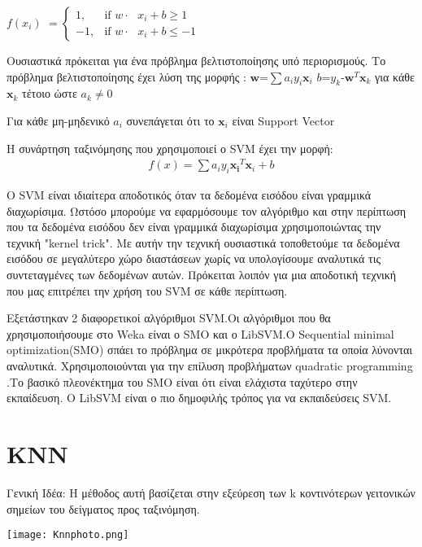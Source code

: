  $f(x_i)$ 
$ = \begin{cases} 1, & \mbox{if } w\cdot\mbox{ $x_i +b \geq 1 $} \\ -1, & \mbox{if } w\cdot\mbox{ $x_i +b \leq -1 $} \end{cases} $


 Ουσιαστικά πρόκειται για ένα πρόβλημα βελτιστοποίησης υπό περιορισμούς.
 Το πρόβλημα βελτιστοποίησης έχει λύση της μορφής :
\newline $\boldsymbol  w $=$\sum a_i y_i \boldsymbol x_i $ $b$=$y_k$-$\boldsymbol w^T \boldsymbol x_k$ για κάθε $\boldsymbol x_k$ τέτοιο ώστε $a_k\not= 0$
 
 Για κάθε μη-μηδενικό $a_i$ συνεπάγεται ότι το $\boldsymbol x_i$ είναι Support Vector
 
 Η συνάρτηση ταξινόμησης που χρησιμοποιεί ο SVM έχει την μορφή:
\begin{align*} 
f(x)=\sum a_i y_i \boldsymbol {x_i}^T \boldsymbol x_i +b
\end{align*}

Ο SVM είναι ιδιαίτερα αποδοτικός όταν τα δεδομένα εισόδου είναι γραμμικά διαχωρίσιμα. Ωστόσο μπορούμε να εφαρμόσουμε τον αλγόριθμο και στην περίπτωση που τα δεδομένα εισόδου δεν είναι γραμμικά διαχωρίσιμα χρησιμοποιώντας την τεχνική "kernel trick". Με αυτήν την τεχνική ουσιαστικά τοποθετούμε τα δεδομένα εισόδου σε μεγαλύτερο χώρο διαστάσεων χωρίς να υπολογίσουμε αναλυτικά τις συντεταγμένες των δεδομένων αυτών. Πρόκειται λοιπόν για μια αποδοτική τεχνική που μας επιτρέπει την χρήση του SVM σε κάθε περίπτωση.

Εξετάστηκαν 2 διαφορετικοί αλγόριθμοι SVM.Οι αλγόριθμοι που θα χρησιμοποιήσουμε στο Weka είναι ο SMO και ο LibSVM.O Sequential minimal optimization(SMO) σπάει το πρόβλημα σε μικρότερα προβλήματα τα οποία λύνονται αναλυτικά. Χρησιμοποιούνται για την επίλυση προβλήματων quadratic programming .Το βασικό πλεονέκτημα του SMO είναι ότι είναι ελάχιστα ταχύτερο στην εκπαίδευση. O LibSVM είναι ο πιο δημοφιλής τρόπος για να εκπαιδεύσεις SVM.


 
\section{KNN}

Γενική Ιδέα: Η μέθοδος αυτή βασίζεται στην εξεύρεση των k κοντινότερων γειτονικών σημείων του δείγματος προς ταξινόμηση.

\begin{center}
	\texttt{[image: Knnphoto.png]}
	\label{fig:KNN}  
\end{center}

